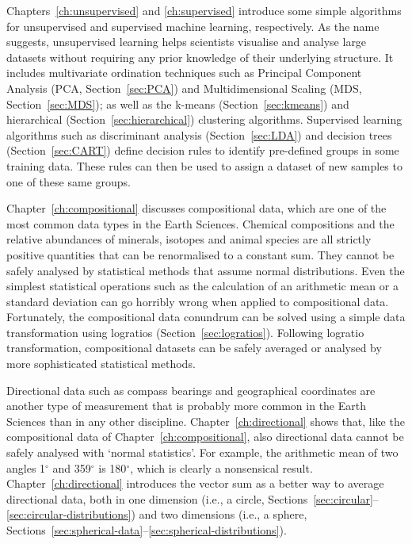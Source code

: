 Chapters~\ref{ch:unsupervised} and \ref{ch:supervised} introduce some
simple algorithms for unsupervised and supervised machine learning,
respectively. As the name suggests, unsupervised learning helps
scientists visualise and analyse large datasets without requiring any
prior knowledge of their underlying structure. It includes
multivariate ordination techniques such as Principal Component
Analysis (PCA, Section~\ref{sec:PCA}) and Multidimensional Scaling
(MDS, Section~\ref{sec:MDS}); as well as the k-means
(Section~\ref{sec:kmeans}) and hierarchical
(Section~\ref{sec:hierarchical}) clustering algorithms. Supervised
learning algorithms such as discriminant analysis
(Section~\ref{sec:LDA}) and decision trees (Section~\ref{sec:CART})
define decision rules to identify pre-defined groups in some training
data. These rules can then be used to assign a dataset of new samples
to one of these same groups.\medskip

Chapter~\ref{ch:compositional} discusses compositional data, which are
one of the most common data types in the Earth Sciences. Chemical
compositions and the relative abundances of minerals, isotopes and
animal species are all strictly positive quantities that can be
renormalised to a constant sum. They cannot be safely analysed by
statistical methods that assume normal distributions. Even the
simplest statistical operations such as the calculation of an
arithmetic mean or a standard deviation can go horribly wrong when
applied to compositional data. Fortunately, the compositional data
conundrum can be solved using a simple data transformation using
logratios (Section~\ref{sec:logratios}). Following logratio
transformation, compositional datasets can be safely averaged or
analysed by more sophisticated statistical methods.\medskip

Directional data such as compass bearings and geographical coordinates
are another type of measurement that is probably more common in the
Earth Sciences than in any other
discipline. Chapter~\ref{ch:directional} shows that, like the
compositional data of Chapter~\ref{ch:compositional}, also directional
data cannot be safely analysed with `normal statistics'. For example,
the arithmetic mean of two angles 1$^\circ$ and 359$^\circ$ is
180$^\circ$, which is clearly a nonsensical result.
Chapter~\ref{ch:directional} introduces the vector sum as a better way
to average directional data, both in one dimension (i.e., a circle,
Sections~\ref{sec:circular}--\ref{sec:circular-distributions}) and two
dimensions (i.e., a sphere,
Sections~\ref{sec:spherical-data}--\ref{sec:spherical-distributions}).\medskip

